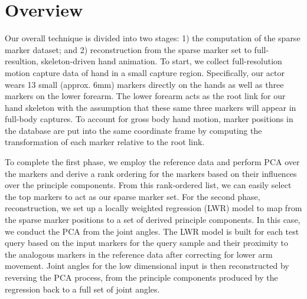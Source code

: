 
\section{Overview}

Our overall technique is divided into two stages: 1) the computation  
of the sparse marker dataset; and 2) reconstruction from the sparse 
marker set to full-resultion, skeleton-driven hand animation.
To start, we collect full-resolution motion capture 
data of hand in a small capture region. 
Specifically, our actor wears 13 small
(approx. 6mm) markers directly on the hands as well as three  
markers on the lower forearm. 
The lower forearm acts as the root link for our hand skeleton with the
assumption that these same three markers will appear in full-body captures. 
To account for gross body hand motion, marker positions in the database are put into the same coordinate
frame by computing the transformation of each marker relative to  
the root link.

To complete the first phase, we employ the reference data and perform PCA over the markers and 
derive a rank ordering for the markers based on their influences over
the principle components.   From this rank-ordered list, we can easily
select the top markers to act as our sparse marker set.
%
For the second phase, reconstruction, we set up a locally weighted regression 
(LWR) model to map from the sparse marker positions to a set of derived principle
components.  In this case, we conduct the PCA from the joint angles.  The LWR model is built
for each test query based on the input markers for the query sample and their proximity to 
the analogous markers in the reference data after correcting for lower arm movement.
%
Joint angles for the low dimensional input is then reconstructed 
by reversing the PCA process, from the principle components produced by 
the regression back to a full set of joint angles. 
